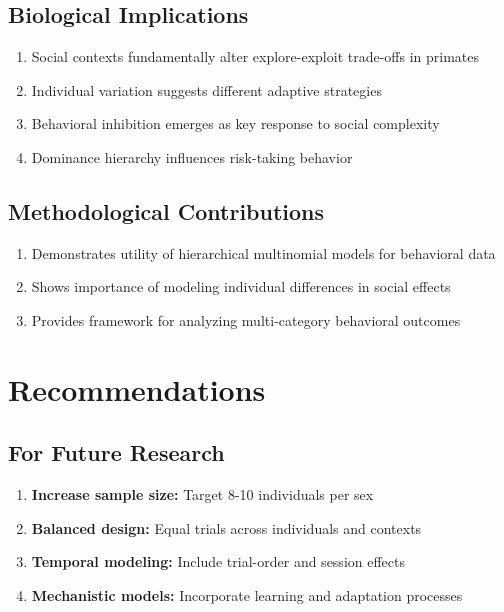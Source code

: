 \documentclass[11pt,a4paper]{article}
\begin{document}
\subsection{Biological Implications}
\begin{enumerate}
    \item Social contexts fundamentally alter explore-exploit trade-offs in primates
    \item Individual variation suggests different adaptive strategies
    \item Behavioral inhibition emerges as key response to social complexity
    \item Dominance hierarchy influences risk-taking behavior
\end{enumerate}

\subsection{Methodological Contributions}
\begin{enumerate}
    \item Demonstrates utility of hierarchical multinomial models for behavioral data
    \item Shows importance of modeling individual differences in social effects
    \item Provides framework for analyzing multi-category behavioral outcomes
\end{enumerate}

\section{Recommendations}

\subsection{For Future Research}
\begin{enumerate}
    \item \textbf{Increase sample size:} Target 8-10 individuals per sex
    \item \textbf{Balanced design:} Equal trials across individuals and contexts
    \item \textbf{Temporal modeling:} Include trial-order and session effects
    \item \textbf{Mechanistic models:} Incorporate learning and adaptation processes
\end{enumerate}
\end{document}
